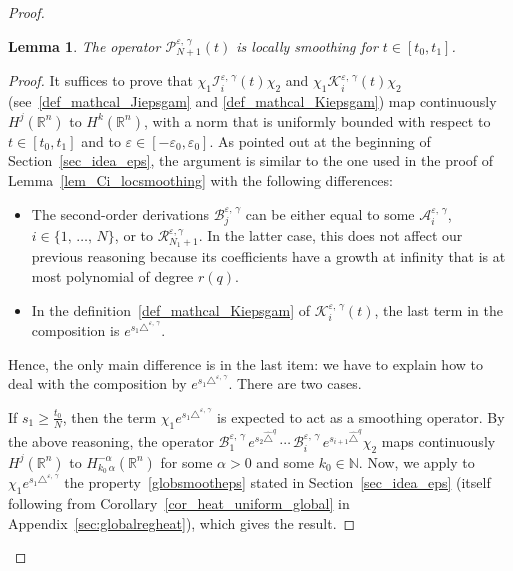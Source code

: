 \documentclass[10pt]{amsart}
\newtheorem{lemm}[theo]{Lemma}\newtheorem{prop}[theo]{Proposition}\newtheorem{coro}[theo]{Corollary}\newtheorem{conj}[theo]{Conjecture}
\theoremstyle{definition}\newtheorem{defi}[theo]{Definition}\newtheorem{rema}[theo]{Remark}\newtheorem{exam}[theo]{Example}\newtheorem{exem}[theo]{Example}\newtheorem{nota}[theo]{Notation}
\newcommand*\R{\mathbb{R}}
\newcommand*\N{\mathbb{N}}
\newcommand{\calK}{\mathcal{K}}
\newcommand{\calA}{\mathcal{A}}
\newcommand{\calR}{\mathcal{R}}
\newcommand{\calI}{\mathcal{I}}
\newcommand{\calP}{\mathcal{P}}
\newcommand{\calB}{\mathcal{B}}
\renewcommand{\geq}{\geqslant}
\begin{document}
\begin{proof}
\begin{lemm}
The operator $\calP_{N+1}^{\varepsilon,\,\gamma}(t)$ is locally smoothing for $t\in[t_0,t_1]$.
\end{lemm}

\begin{proof}
It suffices to prove that $\chi_1\calI_i^{\varepsilon,\,\gamma}(t)\chi_2$ and $\chi_1\calK_i^{\varepsilon,\,\gamma}(t)\chi_2$ (see~\eqref{def_mathcal_Jiepsgam} and \eqref{def_mathcal_Kiepsgam}) map continuously $H^j(\R^n)$ to $H^k(\R^n)$, with a norm that is uniformly bounded with respect to $t\in[t_0,t_1]$ and to $\varepsilon\in[-\varepsilon_0,\varepsilon_0]$. As pointed out at the beginning of Section~\ref{sec_idea_eps}, the argument is similar to the one used in the proof of Lemma~\ref{lem_Ci_locsmoothing} with the following differences:
\begin{itemize}
\item The second-order derivations $\calB_{j}^{\varepsilon,\,\gamma}$ can be either equal to some $\calA_i^{\varepsilon,\,\gamma}$, $i\in\{1,\,\ldots,\,N\}$, or to $\calR_{N_1+1}^{\varepsilon,\gamma}$. In the latter case, this does not affect our previous reasoning because its coefficients have a growth at infinity that is at most polynomial of degree $r(q)$.
\item In the definition~\eqref{def_mathcal_Kiepsgam} of $\calK_i^{\varepsilon,\,\gamma}(t)$, the last term in the composition is $e^{s_1 \triangle^{\varepsilon,\,\gamma}}$.
\end{itemize}
Hence, the only main difference is in the last item: we have to explain how to deal with the composition by $e^{s_1 \triangle^{\varepsilon,\,\gamma}}$. There are two cases.

If $s_1\geq \frac{t_0}{N}$, then the term $\chi_1 e^{s_1 \triangle^{\varepsilon,\,\gamma}}$ is expected to act as a smoothing operator. By the above reasoning, the operator $\calB_{1}^{\varepsilon,\,\gamma} \, e^{s_2 \widehat{\triangle}^{q}}\,\cdots\,\calB_i^{\varepsilon,\,\gamma} \, e^{s_{i+1} \widehat{\triangle}^{q}} \chi_2$ maps continuously $H^j(\R^n)$ to $H^{-\alpha}_{k_0\,\alpha}(\R^n)$ for some $\alpha>0$ and some $k_0\in\N$. Now, we apply to $\chi_1 e^{s_1 \triangle^{\varepsilon,\,\gamma}}$ the property~\eqref{globsmootheps} stated in Section~\ref{sec_idea_eps} (itself following from Corollary~\ref{cor_heat_uniform_global} in Appendix~\ref{sec:globalregheat}), which gives the result.


\end{proof}
\end{proof}
\end{document}
